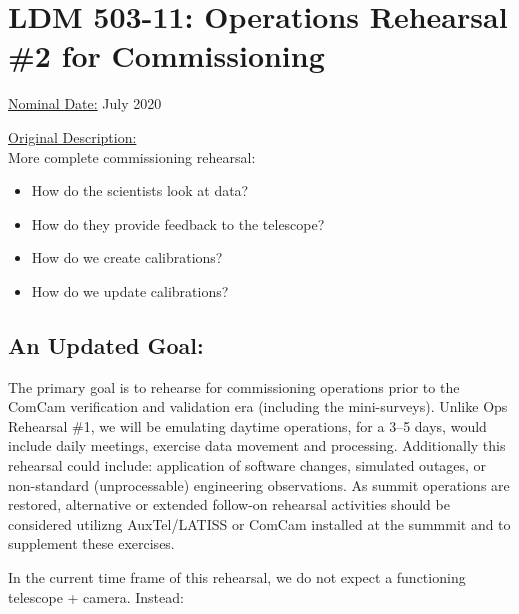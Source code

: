 
\section{LDM 503-11: Operations Rehearsal \#2 for Commissioning}

\underline{Nominal Date:} July 2020

\underline{Original Description:}\\
More complete commissioning rehearsal: 
\begin{itemize}[topsep=-8pt]
\item How do the scientists look at data? 
\item How do they provide feedback to the telescope?
\item How do we create calibrations?
\item How do we update calibrations?
\end{itemize}

\subsection{An Updated Goal:}

The primary goal is to rehearse for commissioning operations prior to the ComCam 
verification and validation era (including the mini-surveys).  
Unlike Ops Rehearsal \#1, we will be emulating daytime operations, 
for a 3--5 days, would include daily meetings, exercise data movement and
processing.  Additionally this rehearsal could include: application of software 
changes, simulated outages, or non-standard (unprocessable) engineering 
observations.  As summit operations are restored, alternative or 
extended follow-on rehearsal activities should be considered utilizng AuxTel/LATISS
or ComCam installed at the summmit and to supplement these exercises.

In the current time frame of this rehearsal, we do not expect a functioning 
telescope + camera.  Instead:

